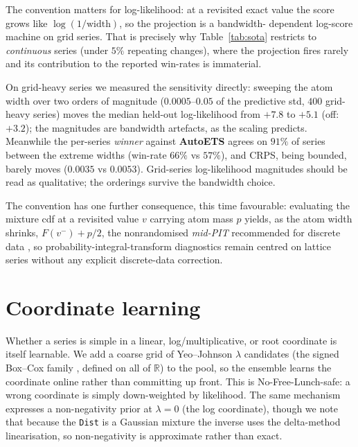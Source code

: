 \documentclass[article]{jss}
\providecommand{\pkg}[1]{\textbf{#1}}
\providecommand{\code}[1]{\texttt{#1}}
\begin{document}
The convention matters for log-likelihood: at a revisited exact value the
score grows like $\log(1/\text{width})$, so the projection is a bandwidth-%
dependent log-score machine on grid series. That is precisely why
Table~\ref{tab:sota} restricts to \emph{continuous} series (under $5\%$
repeating changes), where the projection fires rarely and its contribution to
the reported win-rates is immaterial.

On grid-heavy series we measured the
sensitivity directly: sweeping the atom width over two orders of magnitude
($0.0005$--$0.05$ of the predictive std, $400$ grid-heavy series) moves the
median held-out log-likelihood from $+7.8$ to $+5.1$ (off: $+3.2$); the
magnitudes are bandwidth artefacts, as the scaling predicts. Meanwhile the
per-series \emph{winner} against \pkg{AutoETS} agrees on $91\%$ of series
between the extreme widths (win-rate $66\%$ vs $57\%$), and CRPS, being
bounded, barely moves ($0.0035$ vs $0.0053$). Grid-series log-likelihood
magnitudes should be read as qualitative; the orderings survive the bandwidth
choice.

The convention has one further consequence, this time favourable:
evaluating the mixture cdf at a revisited value $v$ carrying atom mass $p$
yields, as the atom width shrinks, $F(v^-)+p/2$, the nonrandomised
\emph{mid-PIT} recommended for discrete data \citep{czado2009predictive},
so probability-integral-transform diagnostics remain centred on lattice series
without any explicit discrete-data correction.

\section{Coordinate learning} \label{sec:coord}

Whether a series is simple in a linear, log/multiplicative, or root coordinate is
itself learnable. We add a coarse grid of Yeo--Johnson $\lambda$
candidates (the signed Box--Cox family \citep{box1964analysis,yeo2000new},
defined on all of $\mathbb R$) to the pool, so the ensemble learns the
coordinate online rather than committing up front. This is No-Free-Lunch-safe: a
wrong coordinate is simply down-weighted by likelihood. The same mechanism
expresses a non-negativity prior at $\lambda=0$ (the log coordinate), though we
note that because the \code{Dist} is a Gaussian mixture the inverse uses the
delta-method linearisation, so non-negativity is approximate rather than exact.
\end{document}
